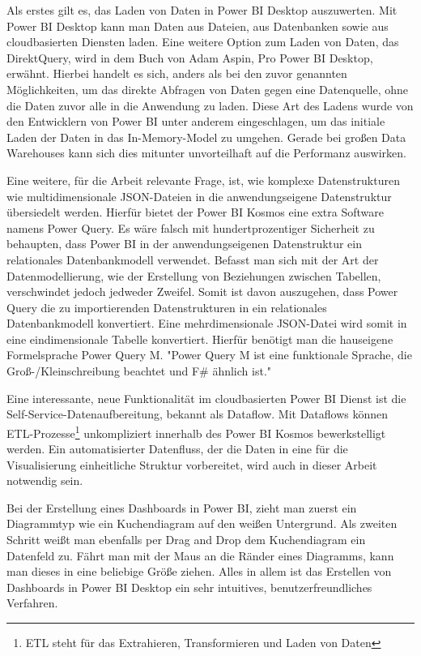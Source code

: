 Als erstes gilt es, das Laden von Daten in Power BI Desktop auszuwerten. Mit Power BI Desktop kann man 
Daten aus Dateien, aus Datenbanken sowie aus cloudbasierten Diensten laden. Eine weitere Option zum Laden 
von Daten, das DirektQuery, wird in dem Buch von Adam Aspin, Pro Power BI Desktop, erwähnt. 
Hierbei handelt es sich, anders als bei den zuvor genannten Möglichkeiten, um das direkte
Abfragen von Daten gegen eine Datenquelle, ohne die Daten zuvor alle in die Anwendung zu laden.\cite[S. 111]{ProPowerBIDesktop}
Diese Art des Ladens wurde von den Entwicklern von Power BI unter anderem eingeschlagen,
um das initiale Laden der Daten in das In-Memory-Model zu umgehen. Gerade bei großen Data Warehouses
kann sich dies mitunter unvorteilhaft auf die Performanz auswirken.

Eine weitere, für die Arbeit relevante Frage, ist, wie komplexe Datenstrukturen wie multidimensionale JSON-Dateien
in die anwendungseigene Datenstruktur übersiedelt werden. Hierfür bietet der Power BI Kosmos eine extra Software
namens Power Query. Es wäre falsch mit hundertprozentiger Sicherheit zu behaupten, dass Power BI in der
anwendungseigenen Datenstruktur ein relationales Datenbankmodell verwendet. Befasst man sich mit der Art
der Datenmodellierung, wie der Erstellung von Beziehungen zwischen Tabellen, verschwindet jedoch jedweder Zweifel. \cite[S. 319]{ProPowerBIDesktop}
Somit ist davon auszugehen, dass Power Query die zu importierenden Datenstrukturen in ein relationales Datenbankmodell
konvertiert. Eine mehrdimensionale JSON-Datei wird somit in eine eindimensionale Tabelle konvertiert.
Hierfür benötigt man die hauseigene Formelsprache Power Query M. "Power Query M ist eine funktionale Sprache,
die Groß-/Kleinschreibung beachtet und F\# ähnlich ist."\cite{MicrosoftDocsPowerQueryFormelsprache}

Eine interessante, neue Funktionalität im cloudbasierten Power BI Dienst ist die Self-Service-Datenaufbereitung,
bekannt als Dataflow. Mit Dataflows können ETL-Prozesse\footnote{ETL steht für das Extrahieren, Transformieren und Laden von Daten}
unkompliziert innerhalb des Power BI Kosmos bewerkstelligt werden. Ein automatisierter Datenfluss,
der die Daten in eine für die Visualisierung einheitliche Struktur vorbereitet, wird auch in dieser
Arbeit notwendig sein.

Bei der Erstellung eines Dashboards in Power BI, zieht man zuerst ein Diagrammtyp wie ein Kuchendiagram
auf den weißen Untergrund. Als zweiten Schritt weißt man ebenfalls per Drag and Drop dem Kuchendiagram ein
Datenfeld zu. Fährt man mit der Maus an die Ränder eines Diagramms, kann man dieses in eine beliebige Größe
ziehen. Alles in allem ist das Erstellen von Dashboards in Power BI Desktop ein sehr intuitives,
benutzerfreundliches Verfahren.

